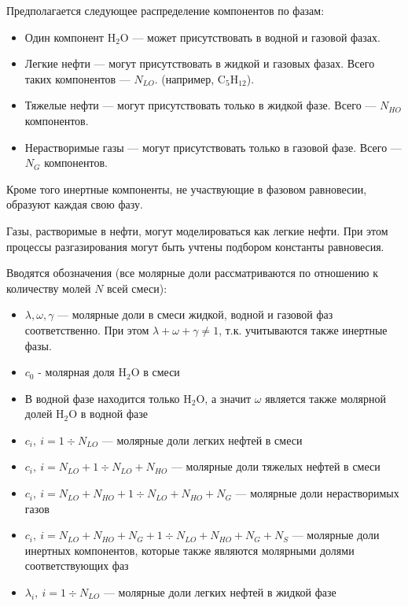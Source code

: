 \documentclass[12pt]{article}
\let\dividesymbol\div
\renewcommand{\div}{\operatorname{div}}
\begin{document}
Предполагается следующее распределение компонентов по фазам:
\begin{itemize}
\item Один компонент $\mathrm{H_2O}$ --- может присутствовать в водной и газовой фазах.
\item Легкие нефти --- могут присутствовать в жидкой и газовых фазах. Всего таких компонентов --- $N_{LO}$. (например, $\mathrm{C_5H_{12}}$).
\item Тяжелые нефти --- могут присутствовать только в жидкой фазе. Всего --- $N_{HO}$ компонентов.
\item Нерастворимые газы --- могут присутствовать только в газовой фазе. Всего --- $N_{G}$ компонентов.
\end{itemize}

Кроме того инертные компоненты, не участвующие в фазовом равновесии, образуют каждая свою фазу.

Газы, растворимые в нефти, могут моделироваться как легкие нефти. При этом процессы разгазирования могут быть учтены подбором константы равновесия.

Вводятся обозначения (все молярные доли рассматриваются по отношению к количеству молей $N$ всей смеси):
\begin{itemize}
\item $\lambda, \omega, \gamma$ --- молярные доли в смеси жидкой, водной и газовой фаз соответственно. При этом $\lambda + \omega + \gamma \ne 1$, т.к. учитываются также инертные фазы.
\item $c_0$ - молярная доля $\mathrm{H_2O}$ в смеси
\item В водной фазе находится только $\mathrm{H_2O}$, а значит $\omega$ является также молярной долей $\mathrm{H_2O}$ в водной фазе
\item $c_i, \: i = 1 \dividesymbol N_{LO}$ --- молярные доли легких нефтей в смеси
\item $c_i, \: i = N_{LO} + 1 \dividesymbol N_{LO} + N_{HO}$ --- молярные доли тяжелых нефтей в смеси
\item $c_i, \: i = N_{LO} + N_{HO} + 1 \dividesymbol N_{LO} + N_{HO} + N_G$ --- молярные доли нерастворимых газов
\item $c_i, \: i = N_{LO} + N_{HO} + N_G + 1 \dividesymbol N_{LO} + N_{HO} + N_G + N_S$ --- молярные доли инертных компонентов, которые также являются молярными долями соответствующих фаз
\item $\lambda_i, \: i = 1 \dividesymbol N_{LO}$ --- молярные доли легких нефтей в жидкой фазе
\end{itemize}
\end{document}
